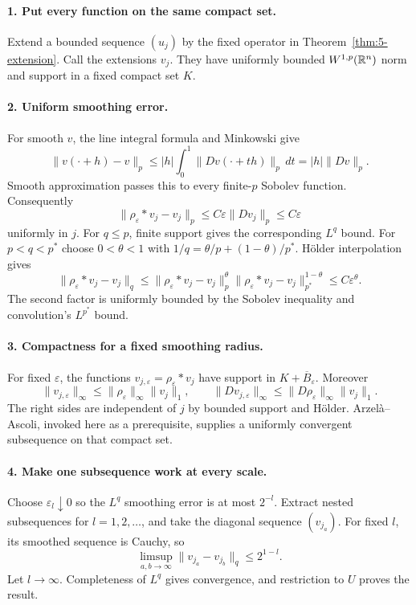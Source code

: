 \begin{expandedproof}
\paragraph{1. Put every function on the same compact set.}
Extend a bounded sequence $(u_j)$ by the fixed operator in
Theorem~\ref{thm:5-extension}. Call the extensions $v_j$.
They have uniformly bounded $W^{1,p}(\mathbb{R}^n)$ norm and support in a fixed
compact set $K$.

\paragraph{2. Uniform smoothing error.}
For smooth $v$, the line integral formula and Minkowski give
\[
 \|v(\cdot+h)-v\|_p
 \leq |h|\int_0^1\|Dv(\cdot+th)\|_p\,dt
 =|h|\|Dv\|_p .
\]
Smooth approximation passes this to every finite-$p$ Sobolev function.
Consequently
\[
 \|\rho_\varepsilon*v_j-v_j\|_p
 \leq C\varepsilon\|Dv_j\|_p\leq C\varepsilon
\]
uniformly in $j$.
For $q\leq p$, finite support gives the corresponding $L^q$ bound.
For $p<q<p^*$ choose $0<\theta<1$ with
$1/q=\theta/p+(1-\theta)/p^*$. H\"older interpolation gives
\[
 \|\rho_\varepsilon*v_j-v_j\|_q
 \leq\|\rho_\varepsilon*v_j-v_j\|_p^\theta
      \|\rho_\varepsilon*v_j-v_j\|_{p^*}^{1-\theta}
 \leq C\varepsilon^\theta .
\]
The second factor is uniformly bounded by the Sobolev inequality
and convolution's $L^{p^*}$ bound.

\paragraph{3. Compactness for a fixed smoothing radius.}
For fixed $\varepsilon$, the functions $v_{j,\varepsilon}
=\rho_\varepsilon*v_j$ have support in $K+\overline B_\varepsilon$.
Moreover
\[
 \|v_{j,\varepsilon}\|_\infty
 \leq\|\rho_\varepsilon\|_\infty\|v_j\|_1,\qquad
 \|Dv_{j,\varepsilon}\|_\infty
 \leq\|D\rho_\varepsilon\|_\infty\|v_j\|_1 .
\]
The right sides are independent of $j$ by bounded support and H\"older.
Arzel\`a--Ascoli, invoked here as a prerequisite, supplies a uniformly
convergent subsequence on that compact set.

\paragraph{4. Make one subsequence work at every scale.}
Choose $\varepsilon_l\downarrow0$ so the $L^q$ smoothing error is
at most $2^{-l}$. Extract nested subsequences for $l=1,2,\ldots$, and
take the diagonal sequence $(v_{j_a})$. For fixed $l$, its smoothed
sequence is Cauchy, so
\[
 \limsup_{a,b\to\infty}\|v_{j_a}-v_{j_b}\|_q\leq2^{1-l}.
\]
Let $l\to\infty$. Completeness of $L^q$ gives convergence, and restriction
to $U$ proves the result.


\end{expandedproof}
